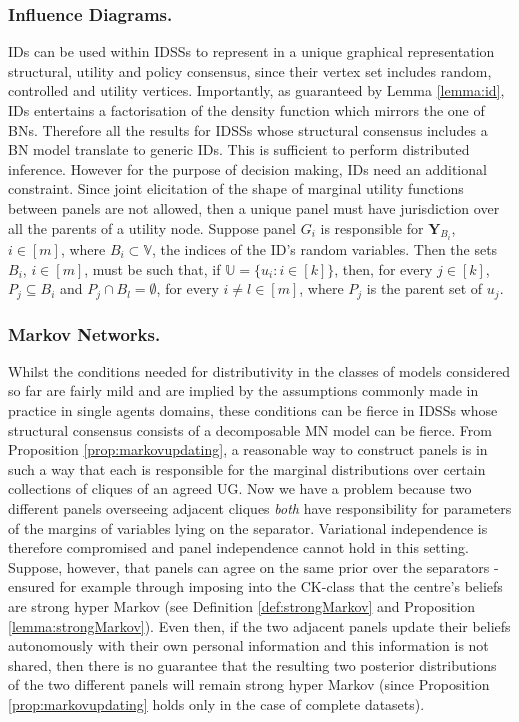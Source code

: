 \subsubsection{Influence Diagrams.}
IDs can be used within IDSSs to represent in a unique graphical representation structural, utility and policy consensus, since their vertex set includes random, controlled and utility vertices. Importantly, as guaranteed by Lemma \ref{lemma:id}, IDs entertains a factorisation of the density function which mirrors the one of BNs. Therefore all the results for IDSSs whose structural consensus includes a BN model translate to generic IDs. This is sufficient to perform distributed inference. However for the purpose of decision making, IDs need an additional constraint. Since joint elicitation of the shape of marginal utility functions between panels  are not allowed, then a unique panel must have jurisdiction over all the parents of a utility node. Suppose panel $G_i$ is responsible for $\bm{Y}_{B_i}$, $i\in[m]$, where $B_i\subset \mathbb{V}$, the indices of the ID's random variables. Then the sets $B_i$, $i\in[m]$, must be such that, if $\mathbb{U}=\{u_i:i\in[k]\}$, then, for every $j\in[k]$, $P_j\subseteq B_i$ and $P_j\cap B_l=\emptyset$, for every $i\neq l\in[m]$, where $P_j$ is the parent set of $u_j$.

\subsubsection{Markov Networks.}
Whilst the conditions needed for distributivity in the classes of models considered so far are fairly mild and are implied by the assumptions commonly made in practice in single agents domains, these conditions  can be fierce in IDSSs whose structural consensus consists of a decomposable MN model can be fierce. From Proposition \ref{prop:markovupdating}, a reasonable way to construct panels is in  such a way that each is responsible for the marginal distributions over certain collections of cliques of an agreed UG. Now we have a problem because two different panels overseeing adjacent cliques  \emph{both} have responsibility for parameters of the margins of variables lying on the separator.  Variational independence is therefore  compromised and  panel independence cannot hold in this setting. Suppose, however, that panels can agree on the same prior over the separators - ensured for example through imposing into the CK-class that the centre's beliefs are strong hyper Markov (see Definition \ref{def:strongMarkov} and Proposition \ref{lemma:strongMarkov}). Even then, if the two adjacent panels update their beliefs autonomously with their own personal information and this information is not shared, then there is no guarantee that the resulting two posterior distributions of the two different panels will remain strong hyper Markov (since Proposition \ref{prop:markovupdating} holds only in the case of complete datasets). 

